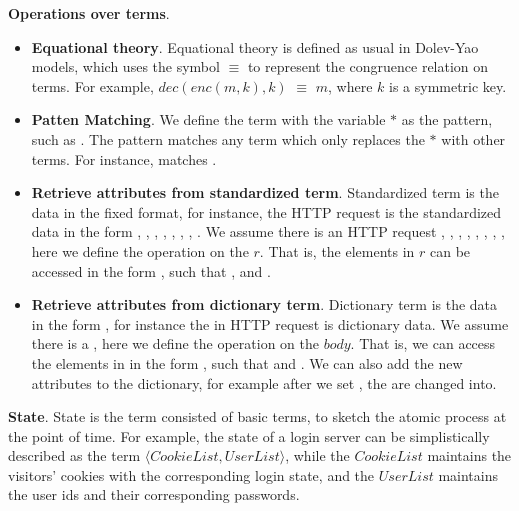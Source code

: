 \vspace{1mm}
\noindent\textbf{Operations over terms}.
\begin{itemize}
\item \textbf{Equational theory}. Equational theory is defined as usual in Dolev-Yao models, which uses the symbol $\equiv$ to represent the congruence relation on terms. For example, $dec(enc(m, k), k)$ $\equiv$ $m$, where $k$ is a symmetric key.
\item \textbf{Patten Matching}.  We define the term with the variable $*$ as the pattern, such as .
The pattern matches any term which only replaces the $*$ with other terms. For instance,   matches .
\item \textbf{Retrieve attributes from standardized term}. Standardized term is the data in the fixed format, for instance, the HTTP request is the standardized data in the form , , , , , , , .  We assume there is an HTTP request   ,  ,  ,  ,  ,  \myss{\myangle{}},  \myss{\myangle{}},  \myss{\myangle{}\rangle}, here we define the operation on the $r$. That is, the elements in $r$ can be accessed in the form , such that ,   and .
\item \textbf{Retrieve attributes from dictionary term}. Dictionary term is the data in the form , for instance the  in HTTP request is dictionary data. We assume there is a , here we define the operation on the $body$. That is, we can access the elements in  in the form , such that  and . We can also add the new attributes to the dictionary, for example after we set , the  are changed into.
\end{itemize}

\vspace{1mm}
\noindent\textbf{State}. State is the term consisted of basic terms, to sketch the atomic process at the point of time. For example, the state of a login server can be simplistically described as the term $\langle CookieList,UserList \rangle$, while the $CookieList$ maintains the visitors' cookies with the corresponding login state, and the $UserList$ maintains the user ids and their corresponding passwords.


